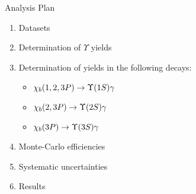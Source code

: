\begin{frame}{Analysis Plan}
\begin{enumerate}
\item Datasets
\item Determination of $\Upsilon$ yields
\item Determination of \chib yields in the following decays:
\begin{itemize}
    \item $\chi_b(1,2,3P) \to \OneS \gamma$
    \item $\chi_b(2,3P) \to \TwoS \gamma$
    \item $\chi_b(3P) \to \ThreeS \gamma$
\end{itemize}
\item Monte-Carlo efficiencies
\item Systematic uncertainties 
\item Results
\end{enumerate}
\end{frame}
